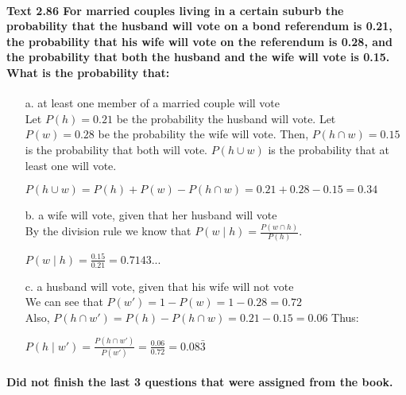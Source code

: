 \documentclass{article}
\begin{document}
\paragraph{Text 2.86 For married couples living in a certain suburb the probability 
that the husband will vote on a bond referendum is 0.21, the probability that his wife
will vote on the referendum is 0.28, and the probability that both the husband and the
wife will vote is 0.15. What is the probability that:\\}
\begin{enumerate}
\item[a.] at least one member of a married couple will vote\\
Let $P(h)=0.21$ be the probability the husband will vote. Let $P(w)=0.28$ be the
probability the wife will vote. Then, $P(h \cap w) = 0.15$ is the probability that both
will vote. $P(h \cup w)$ is the probability that at least one will vote. 
\begin{center}
$\boxed{P(h \cup w) = P(h) + P(w) - P(h \cap w) = 0.21+0.28-0.15 = 0.34}$
\end{center}

\item[b.] a wife will vote, given that her husband will vote\\
By the division rule we know that $P(w\mid h) = \frac{P(w \cap h)}{P(h)}$.
\begin{center}
$\boxed{P(w\mid h) = \frac{0.15}{0.21} = 0.7143...}$
\end{center}

\item[c.] a husband will vote, given that his wife will not vote\\
We can see that $P(w') = 1-P(w) = 1-0.28 = 0.72$\\
Also, $P(h \cap w') = P(h) - P(h \cap w) = 0.21 - 0.15 = 0.06$
Thus:
\begin{center}
$\boxed{P(h\mid w') = \frac{P(h \cap w')}{P(w')} = \frac{0.06}{0.72} = 0.08\bar3}$
\end{center}
\end{enumerate}

\paragraph{Did not finish the last 3 questions that were assigned from the book.}
\end{document}
